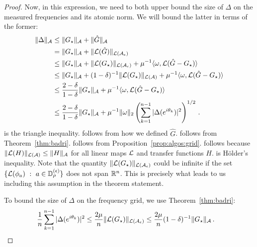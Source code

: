\begin{proof}
Now, in this expression, we need to both upper bound the size of $\Delta$ on the measured frequencies and its atomic norm.  We will bound the latter in terms of the former:
\begin{subequations}
\begin{align}
\label{eq:tri-ineq3}	\|\Delta\|_{\mathcal{A}} &\leq \| G_\star\|_{\mathcal{A}}+\|\hat{G}\|_{\mathcal{A}}\\
\label{eq:Ghat-def}	& = \|G_\star\|_{\mathcal{A}} + \|\mathcal{L}(\hat{G})\|_{\mathcal{L}(\mathcal{A}_\epsilon)}\\
\label{eq:apply-dast-cond}	& \leq \|G_\star\|_{\mathcal{A}} + \|\mathcal{L}(G_\star)\|_{\mathcal{L}(\mathcal{A}_\epsilon)} + \mu^{-1} \langle \omega, \mathcal{L}(\hat{G}-G_{\star})\rangle \\
\label{eq:apply-grid-prop}	& \leq \|G_\star\|_{\mathcal{A}} + (1-\delta)^{-1}\| \mathcal{L}(G_\star)\|_{\mathcal{L}(\mathcal{A})} + \mu^{-1} \langle \omega, \mathcal{L}(\hat{G}-G_{\star})\rangle \\
\label{eq:inf-domination}		& \leq \frac{2-\delta}{1-\delta} \|G_\star\|_{\mathcal{A}}  + \mu^{-1} \langle \omega, \mathcal{L}(\hat{G}-G_{\star})\rangle \\
\label{eq:holder-mf}		& \leq \frac{2-\delta}{1-\delta} \|G_\star\|_{\mathcal{A}}  + \mu^{-1} \| \omega\|_2 \left(\sum_{k=1}^{n-1} |\Delta(e^{i\theta_k})|^2\right)^{1/2} \,.
\end{align}
\end{subequations}
 is the triangle inequality.  follows from how we defined $\hat{G}$.   follows from Theorem~\ref{thm:badri}.   follows from Proposition~\ref{prop:algos:grid}.   follows because $\|\mathcal{L}(H)\|_{\mathcal{L}(\mathcal{A})} \leq \|H\|_{\mathcal{A}}$ for all linear maps $\mathcal{L}$ and transfer functions $H$.   is H\"{o}lder's inequality.  Note that the quantity $\|\mathcal{L}(G_\star)\|_{\mathcal{L}(\mathcal{A}_\epsilon)}$ could be infinite if the set $\{\mathcal{L}(\phi_a)~:~a\in \mathbb{D}_{\rho}^{(\epsilon)}\}$ does not span $\mathbb{R}^n$.  This is precisely what leads to us including this assumption in the theorem statement.

To bound the size of $\Delta$ on the frequency grid, we use Theorem~\ref{thm:badri}:
\begin{align*}
	\frac{1}{n}\sum_{k=1}^{n-1} |\Delta(e^{i\theta_k})|^2  &\leq \frac{2\mu}{n} \|\mathcal{L}(G_\star)\|_{\mathcal{L}(\mathcal{A}_\epsilon)}
	\leq \frac{2\mu}{n} (1-\delta)^{-1}\|G_\star\|_{\mathcal{A}}	\,.
\end{align*}



\end{proof}
